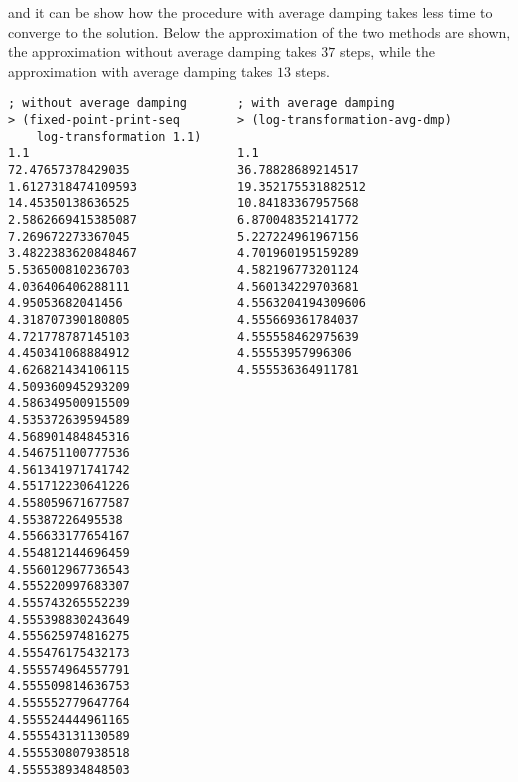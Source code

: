 and it can be  show how the procedure with average damping takes less time to converge to the solution.
Below the approximation of the two methods are shown, the approximation without average damping takes $ 37 $ steps, while 
the approximation with average damping takes $ 13 $ steps.
\begin{lstlisting}
; without average damping       ; with average damping
> (fixed-point-print-seq        > (log-transformation-avg-dmp)       
    log-transformation 1.1)          
1.1                             1.1
72.47657378429035               36.78828689214517
1.6127318474109593              19.352175531882512
14.45350138636525               10.84183367957568
2.5862669415385087              6.870048352141772
7.269672273367045               5.227224961967156
3.4822383620848467              4.701960195159289
5.536500810236703               4.582196773201124
4.036406406288111               4.560134229703681
4.95053682041456                4.5563204194309606
4.318707390180805               4.555669361784037
4.721778787145103               4.555558462975639
4.450341068884912               4.55553957996306
4.626821434106115               4.555536364911781
4.509360945293209
4.586349500915509
4.535372639594589
4.568901484845316
4.546751100777536
4.561341971741742
4.551712230641226
4.558059671677587
4.55387226495538
4.556633177654167
4.554812144696459
4.556012967736543
4.555220997683307
4.555743265552239
4.555398830243649
4.555625974816275
4.555476175432173
4.555574964557791
4.555509814636753
4.555552779647764
4.555524444961165
4.555543131130589
4.555530807938518
4.555538934848503
\end{lstlisting} 

